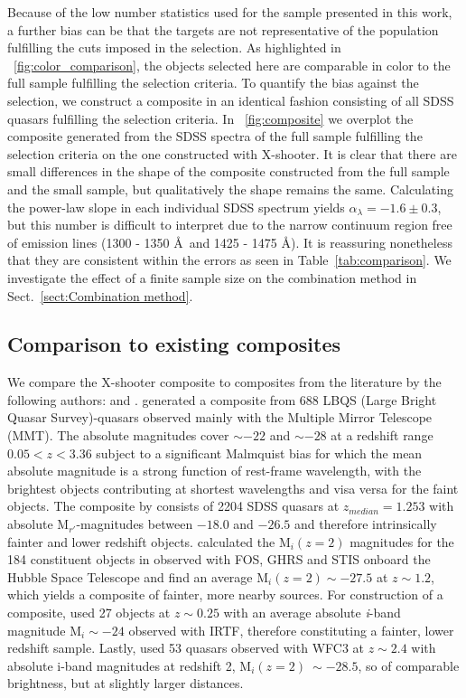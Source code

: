 \documentclass{aa}    %
\newcommand{\figref}[1]{\ref{fig:#1}}
\newcommand{\Fig}[1]{\figurename~\figref{#1}}
\newcommand{\fig}[1]{\Fig{#1}}
\newcommand{\Tab}[1]{Table~\ref{tab:#1}}
\newcommand{\tab}[1]{\Tab{#1}}
\newcommand{\sectionname}{Sect.}
\newcommand{\Sect}[1]{\sectionname~\ref{sect:#1}}
\newcommand{\sect}[1]{\Sect{#1}}
\newcommand{\sectlabel}[1]{\label{sect:#1}}
\begin{document}
Because of the low number statistics used for the sample presented in this work, a
further bias can be that the targets are not representative of the
population fulfilling the cuts imposed in the selection. As
highlighted in \fig{color_comparison}, the objects selected here are comparable in color to the full sample fulfilling the selection criteria. To
quantify the bias against the selection, we construct a composite in
an identical fashion consisting of all SDSS quasars fulfilling the
selection criteria.  In \fig{composite} we overplot the composite
generated from the SDSS spectra of the full sample fulfilling the
selection criteria on the one constructed with X-shooter. It is clear
that there are small differences in the shape of the composite
constructed from the full sample and the small sample, but
qualitatively the shape remains the same. Calculating the power-law
slope in each individual SDSS spectrum yields $\alpha_\lambda = -1.6\pm 0.3$,
but this number is difficult to interpret due to the narrow continuum
region free of emission lines (1300 - 1350 \AA~and 1425 - 1475
\AA). It is reassuring nonetheless that they are consistent within the
errors as seen in \tab{comparison}. We investigate the effect of a
finite sample size on the combination method in \sect{Combination method}.


\subsection{Comparison to existing composites} \sectlabel{comparison}
We compare the X-shooter composite to composites from the literature by the following authors:
\citet{Francis1991, VandenBerk2001, Telfer2002, Glikman2006} and
\citet{Lusso2015}. \citet{Francis1991} generated a composite from 688
LBQS (Large Bright Quasar Survey)-quasars observed mainly with the Multiple Mirror Telescope (MMT). The absolute magnitudes cover $\sim -22$
and $\sim -28$ at a redshift range $0.05 < z < 3.36$ subject to a
significant Malmquist bias for which the mean absolute magnitude is a
strong function of rest-frame wavelength, with the brightest objects
contributing at shortest wavelengths and visa versa for the faint
objects. The composite by \citet{VandenBerk2001} consists of 2204 SDSS
quasars at $z_{median} = 1.253$ with absolute M$_{r'}$-magnitudes
between $-18.0$ and $-26.5$ and therefore intrinsically fainter and
lower redshift objects. \citet{Lusso2015} calculated the M$_i(z=2)$
magnitudes for the 184 constituent objects in \citet{Telfer2002}
observed with FOS, GHRS and STIS onboard the Hubble Space Telescope and find an average
M$_i(z=2) \sim -27.5$ at $z \sim 1.2$, which yields a composite of
fainter, more nearby sources. For construction of a composite,
\citet{Glikman2006} used 27 objects at $z \sim 0.25$ with an average
absolute \textit{i}-band magnitude M$_i \sim -24$ observed with IRTF,
therefore constituting a fainter, lower redshift sample. Lastly,
\citet{Lusso2015} used 53 quasars observed with WFC3 at $z \sim 2.4$
with absolute i-band magnitudes at redshift 2, M$_i(z=2) ~\sim -28.5$,
so of comparable brightness, but at slightly larger distances.
\end{document}
